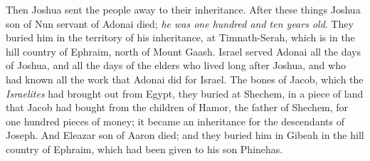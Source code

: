 \begin{biblechapter}
\verse Then Joshua sent the people away to their inheritance.
\verse After these things Joshua son of Nun servant of Adonai died; \textit{he was one hundred and ten years old}.
\verse They buried him in the territory of his inheritance, at Timnath-Serah, which is in the hill country of Ephraim, north of Mount Gaash.
\verse Israel served Adonai all the days of Joshua, and all the days of the elders who lived long after Joshua, and who had known all the work that Adonai did for Israel.
\verse The bones of Jacob, which the \textit{Israelites} had brought out from Egypt, they buried at Shechem, in a piece of land that Jacob had bought from the children of Hamor, the father of Shechem, for one hundred pieces of money; it became an inheritance for the descendants of Joseph.
\verse And Eleazar son of Aaron died; and they buried him in Gibeah in the hill country of Ephraim, which had been given to his son Phinehas.
\end{biblechapter}

